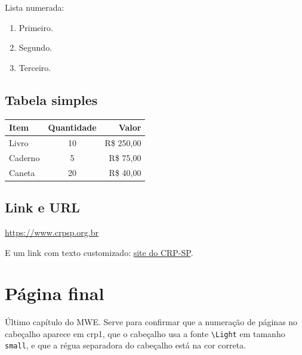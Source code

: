 \documentclass[11pt,a5paper,twoside,openright]{book}
\begin{document}
Lista numerada:
\begin{enumerate}
    \item Primeiro.
    \item Segundo.
    \item Terceiro.
\end{enumerate}

\section{Tabela simples}

\begin{center}
\begin{tabular}{lcr}
    \toprule
    \textbf{Item} & \textbf{Quantidade} & \textbf{Valor} \\
    \midrule
    Livro         & 10                  & R\$ 250,00     \\
    Caderno       &  5                  & R\$  75,00     \\
    Caneta        & 20                  & R\$  40,00     \\
    \bottomrule
\end{tabular}
\end{center}

\section{Link e URL}

\url{https://www.crpsp.org.br}

E um link com texto customizado:
\href{https://www.crpsp.org.br}{site do CRP-SP}.

\chapter{Página final}

Último capítulo do MWE. Serve para confirmar que a numeração
de páginas no cabeçalho aparece em crp1, que o cabeçalho usa
a fonte \texttt{\textbackslash Light} em tamanho \texttt{small},
e que a régua separadora do cabeçalho está na cor correta.
\end{document}
